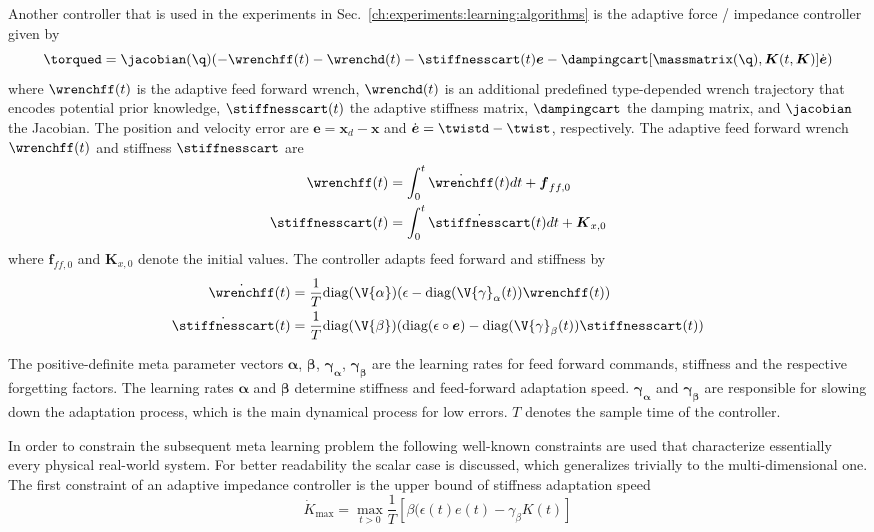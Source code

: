 
Another controller that is used in the experiments in Sec.~\ref{ch:experiments:learning:algorithms} is the adaptive force / impedance controller given by
\begin{equation*}
    \torqued=\jacobian(\q)(-\wrenchff(t)-\wrenchd(t)-\stiffnesscart(t)\boldsymbol{e}-\dampingcart[\massmatrix(\q),\boldsymbol{K}(t,\boldsymbol{K})] \dot{\boldsymbol{e}})
\end{equation*}
where $\wrenchff(t)$ is the adaptive feed forward wrench, $\wrenchd(t)$ is an additional predefined type-depended wrench trajectory that encodes potential prior knowledge, $\stiffnesscart(t)$ the adaptive stiffness matrix, $\dampingcart$ the damping matrix, and $\jacobian$ the Jacobian.
The position and velocity error are $\boldsymbol{e}=\boldsymbol{x}_d-\boldsymbol{x}$ and $\dot{\boldsymbol{e}}=\twistd-\twist$, respectively.
The adaptive feed forward wrench $\wrenchff(t)$ and stiffness $\stiffnesscart$ are
\begin{align*}
    \wrenchff(t)&=\int_0^t \dot{\wrenchff}(t)dt+\boldsymbol{f}_{ff,0}\\
    \stiffnesscart(t)&=\int_0^t \dot{\stiffnesscart}(t)dt + \boldsymbol{K}_{x,0}
\end{align*}
where $\boldsymbol{f}_{ff,0}$ and $\boldsymbol{K}_{x,0}$ denote the initial values.
The controller adapts feed forward and stiffness by
\begin{align*}
    \dot{\wrenchff}(t)&=\frac{1}{T}\text{diag}(\V{\alpha})(\epsilon-\text{diag}(\V{\gamma}_\alpha(t)) \wrenchff(t))\\
    \dot{\stiffnesscart}(t)&=\frac{1}{T}\text{diag}(\V{\beta})(\text{diag}(\epsilon \circ \boldsymbol{e})-\text{diag}(\V{\gamma}_\beta(t)) \stiffnesscart(t))
\end{align*}

The positive-definite meta parameter vectors $\boldsymbol{\alpha}$, $\boldsymbol{\beta}$, $\boldsymbol{\gamma_\alpha}$, $\boldsymbol{\gamma_\beta}$ are the learning rates for feed forward commands, stiffness
and the respective forgetting factors.
The learning rates $\boldsymbol{\alpha}$ and $\boldsymbol{\beta}$ determine stiffness and feed-forward adaptation speed.
$\boldsymbol{\gamma_\alpha}$ and $\boldsymbol{\gamma_\beta}$ are responsible for slowing down the adaptation process, which is the main dynamical process for low errors.
$T$ denotes the sample time of the controller.

In order to constrain the subsequent meta learning problem the following well-known constraints are used that characterize essentially every physical real-world system.
 For better readability the scalar case is discussed, which generalizes trivially to the multi-dimensional one.
 The first constraint of an adaptive impedance controller is the upper bound of stiffness adaptation speed
 \begin{equation*}
     \dot{K}_\text{max}=\max_{t>0} \frac{1}{T} \left[\beta(\epsilon(t)e(t)-\gamma_\beta K(t)\right]
 \end{equation*}

